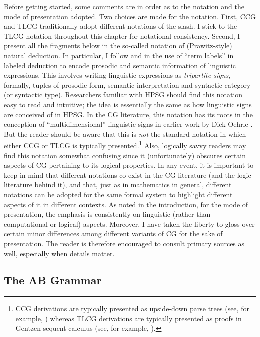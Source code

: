 \documentclass[output=paper,biblatex,babelshorthands,newtxmath,draftmode,colorlinks,citecolor=brown]{langscibook}
\begin{document}
Before getting started, some comments are in order as to the notation
and the mode of presentation adopted. Two choices are made for the
notation. First, CCG and TLCG traditionally adopt different notations
of the slash. I stick to the TLCG notation throughout this chapter for
notational consistency. Second, I present all the fragments below in
the so-called  notation of (Prawitz-style)
natural deduction. In particular, I follow \citet{oehrle1994} and
\citet{Morrill94a-u} in the use of ``term labels'' in labeled deduction
to encode prosodic and semantic information of linguistic expressions.
This involves writing linguistic expressions as \emph{tripartite
signs}, formally, tuples of prosodic form, semantic interpretation and
syntactic category (or syntactic type). Researchers familiar with HPSG
should find this notation easy to read and intuitive; the idea is
essentially the same as how linguistic signs are conceived of in HPSG.
In the CG literature, this notation has its roots in the conception of
``multidimensional'' linguistic signs in earlier work by Dick Oehrle
\citeyearpar{oehrle88}. But the reader should be aware that this is
\emph{not} the standard notation in which either CCG or TLCG is
typically presented.\footnote{CCG derivations are typically presented
  as upside-down parse trees (see, for example,
  \citealt{Steedman2000a-u,steedman2012}) whereas  TLCG derivations are
  typically presented as proofs in Gentzen sequent calculus (see, for
  example, \citealt{Moortgat2011a-u,barkershan2015}).}
Also, logically savvy readers may find this
notation somewhat confusing since it (unfortunately) obscures certain
aspects of CG pertaining to its logical properties. In any event, it
is important to keep in mind that different notations co-exist in the
CG literature (and the logic literature behind it), and that, just as
in mathematics in general, different notations can be adopted for the
same formal system to highlight different aspects of it in different
contexts. As noted in the introduction,  for the mode of presentation, the emphasis is consistently
on linguistic (rather than computational or logical) aspects.
Moreover, I have taken the liberty to gloss over certain
minor differences among different variants of CG for the sake of
presentation. The reader is therefore encouraged
to consult primary sources as well, especially when details matter.


\subsection{The AB Grammar \label{ab}}
\end{document}
